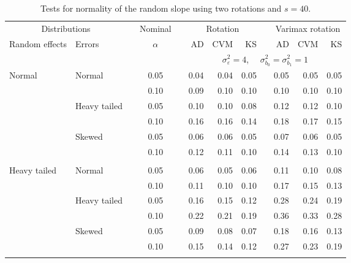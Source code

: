 \begin{table}[ht]
\caption{\label{tab:simb140}Tests for normality of the random slope using two rotations and $s = 40$.}
\begin{scriptsize}
\begin{center}
\begin{tabular}{ll p{.1cm} c p{.1cm} rrr p{.1cm} rrr}
  \hline
  \multicolumn{2}{c}{Distributions}& & Nominal & &  \multicolumn{3}{c}{Rotation} & & \multicolumn{3}{c}{Varimax rotation} \\ \cline{1-2} \cline{6-8} \cline{10-12}   
  Random effects & Errors & & $\alpha$ & & AD & CVM & KS & & AD & CVM & KS \\ 
   \hline
& && && \multicolumn{7}{c}{$\sigma_{\varepsilon}^2 = 4$, \ \ $\sigma_{b_0}^2 = \sigma_{b_1}^2 = 1$} \\ \cline{6-12}
\rowcolor{gray!20}Normal       & Normal       && 0.05 &&  0.04 & 0.04 & 0.05 && 0.05 & 0.05 & 0.05 \\ 
\rowcolor{gray!20}             &              && 0.10 &&  0.09 & 0.10 & 0.10 && 0.10 & 0.10 & 0.10 \\ 
\rowcolor{gray!20}             & Heavy tailed && 0.05 &&  0.10 & 0.10 & 0.08 && 0.12 & 0.12 & 0.10 \\ 
\rowcolor{gray!20}             &              && 0.10 &&  0.16 & 0.16 & 0.14 && 0.18 & 0.17 & 0.15 \\ 
\rowcolor{gray!20}             & Skewed       && 0.05 &&  0.06 & 0.06 & 0.05 && 0.07 & 0.06 & 0.05 \\ 
\rowcolor{gray!20}             &              && 0.10 &&  0.12 & 0.11 & 0.10 && 0.14 & 0.13 & 0.10 \\ 
             &&&&&&&&&&&\\
Heavy tailed & Normal       && 0.05 &&  0.06 & 0.05 & 0.06 && 0.11 & 0.10 & 0.08 \\ 
             &              && 0.10 &&  0.11 & 0.10 & 0.10 && 0.17 & 0.15 & 0.13 \\ 
             & Heavy tailed && 0.05 &&  0.16 & 0.15 & 0.12 && 0.28 & 0.24 & 0.19 \\ 
             &              && 0.10 &&  0.22 & 0.21 & 0.19 && 0.36 & 0.33 & 0.28 \\ 
             & Skewed       && 0.05 &&  0.09 & 0.08 & 0.07 && 0.18 & 0.16 & 0.13 \\ 
             &              && 0.10 &&  0.15 & 0.14 & 0.12 && 0.27 & 0.23 & 0.19 \\ 
             &&&&&&&&&&&\\

\end{tabular}
\end{center}
\end{scriptsize}
\end{table}
